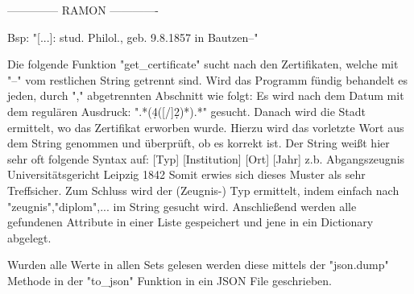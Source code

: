   -------------- RAMON -------------

  Bsp: "[...]: stud. Philol., geb. 9.8.1857 in Bautzen--"

 Die folgende Funktion "get_certificate" sucht nach den Zertifikaten, welche mit "--" vom restlichen String getrennt sind. Wird das Programm fündig behandelt es jeden, durch "," abgetrennten Abschnitt wie folgt:
 Es wird nach dem Datum mit dem regulären Ausdruck: ".*(\d{4}([/]\d{2})*).*"  gesucht. Danach wird die Stadt ermittelt, wo das Zertifikat erworben wurde. Hierzu wird das vorletzte Wort aus dem String genommen und überprüft, ob es korrekt ist. Der String weißt hier sehr oft folgende Syntax auf: [Typ] [Institution] [Ort] [Jahr]
 z.b. Abgangszeugnis Universitätsgericht Leipzig 1842
 Somit erwies sich dieses Muster als sehr Treffsicher.
 Zum Schluss wird der (Zeugnis-) Typ ermittelt, indem einfach nach "zeugnis","diplom",... im String gesucht wird. Anschließend werden alle gefundenen Attribute in einer Liste gespeichert und jene in ein Dictionary abgelegt.

 Wurden alle Werte in allen Sets gelesen werden diese mittels der "json.dump" Methode in der "to_json" Funktion in ein JSON File geschrieben.
